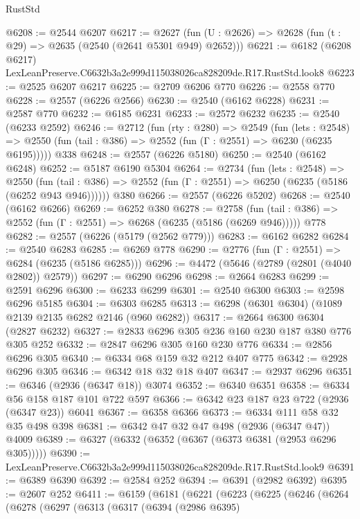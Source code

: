 \begin{lexlean}{RustStd}
\begin{coremodule}
@6208 := @2544 @6207
@6217 := @2627 (fun (U : @2626) => @2628 (fun (t : @29) => @2635 (@2540 (@2641 @5301 @949) @2652)))
@6221 := @6182 (@6208 @6217) LexLeanPreserve.C6632b3a2e999d115038026ca828209de.R17.RustStd.look8
@6223 := @2525 @6207 @6217
@6225 := @2709 @6206 @770
@6226 := @2558 @770
@6228 := @2557 (@6226 @2566)
@6230 := @2540 (@6162 @6228)
@6231 := @2587 @770
@6232 := @6185 @6231
@6233 := @2572 @6232
@6235 := @2540 (@6233 @2592)
@6246 := @2712
    (fun (rty : @280) =>
    @2549
      (fun (lets : @2548) =>
      @2550 (fun (tail : @386) => @2552 (fun (Γ : @2551) => @6230 (@6235 @6195)))))
    @338
@6248 := @2557 (@6226 @5180)
@6250 := @2540 (@6162 @6248)
@6252 := @5187 @6190 @5304
@6264 := @2734
    (fun (lets : @2548) =>
    @2550 (fun (tail : @386) => @2552 (fun (Γ : @2551) => @6250 (@6235 (@5186 (@6252 @943 @946))))))
    @380
@6266 := @2557 (@6226 @5202)
@6268 := @2540 (@6162 @6266)
@6269 := @6252 @380
@6278 := @2758
    (fun (tail : @386) => @2552 (fun (Γ : @2551) => @6268 (@6235 (@5186 (@6269 @946)))))
    @778
@6282 := @2557 (@6226 (@5179 (@2562 @779)))
@6283 := @6162 @6282
@6284 := @2540 @6283
@6285 := @6269 @778
@6290 := @2776 (fun (Γ : @2551) => @6284 (@6235 (@5186 @6285)))
@6296 := @4472 (@5646 (@2789 (@2801 (@4040 @2802)) @2579))
@6297 := @6290 @6296
@6298 := @2664 @6283
@6299 := @2591 @6296
@6300 := @6233 @6299
@6301 := @2540 @6300
@6303 := @2598 @6296 @5185
@6304 := @6303 @6285
@6313 := @6298 (@6301 @6304) (@1089 @2139 @2135 @6282 @2146 (@960 @6282))
@6317 := @2664 @6300 @6304 (@2827 @6232)
@6327 := @2833 @6296 @305 @236 @160 @230 @187 @380 @776 @305 @252
@6332 := @2847 @6296 @305 @160 @230 @776
@6334 := @2856 @6296 @305
@6340 := @6334 @68 @159 @32 @212 @407 @775
@6342 := @2928 @6296 @305
@6346 := @6342 @18 @32 @18 @407
@6347 := @2937 @6296
@6351 := @6346 (@2936 (@6347 @18)) @3074
@6352 := @6340 @6351
@6358 := @6334 @56 @158 @187 @101 @722 @597
@6366 := @6342 @23 @187 @23 @722 (@2936 (@6347 @23)) @6041
@6367 := @6358 @6366
@6373 := @6334 @111 @58 @32 @35 @498 @398
@6381 := @6342 @47 @32 @47 @498 (@2936 (@6347 @47)) @4009
@6389 := @6327 (@6332 (@6352 (@6367 (@6373 @6381 (@2953 @6296 @305)))))
@6390 := LexLeanPreserve.C6632b3a2e999d115038026ca828209de.R17.RustStd.look9
@6391 := @6389 @6390
@6392 := @2584 @252
@6394 := @6391 (@2982 @6392)
@6395 := @2607 @252
@6411 := @6159
    (@6181
      (@6221
        (@6223
          (@6225
            (@6246
              (@6264
                (@6278
                  (@6297
                    (@6313
                      (@6317
                        (@6394
                          (@2986 @6395)

\end{coremodule}
\end{lexlean}
